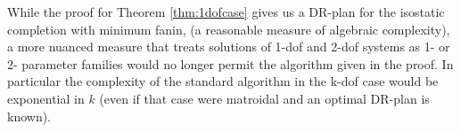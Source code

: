 

\begin{observation}
\label{obs:algebraic_completion}
    While the proof for Theorem \ref{thm:1dofcase} gives us a DR-plan for
    the isostatic completion with minimum fanin, (a reasonable
    measure of algebraic complexity), a more nuanced
    measure that treats solutions of 1-dof and 2-dof systems as
    1- or 2- parameter families would no longer permit the algorithm given
    in the proof. In particular the complexity of the standard algorithm in the k-dof
    case would be exponential in $k$ (even if that case were matroidal and
    an optimal DR-plan is known).
\end{observation}




